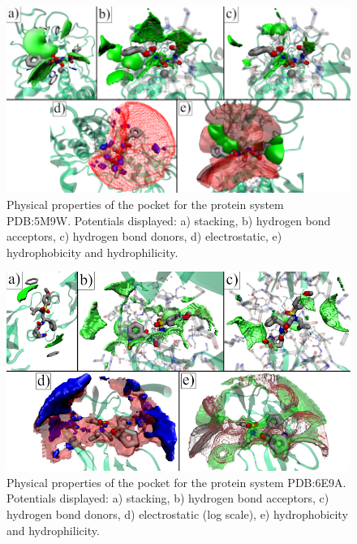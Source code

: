 \begin{figure}[H]
  \centering
  \includegraphics[width=1\textwidth]{figures/appendix/benchmark_prot/5m9w.png}
  \caption{\label{fig:appx_benchmark/5m9w} Physical properties of the pocket for the protein system PDB:5M9W. Potentials displayed: a) stacking, b) hydrogen bond acceptors, c) hydrogen bond donors, d) electrostatic, e) hydrophobicity and hydrophilicity.}
\end{figure}

\begin{figure}[H]
  \centering
  \includegraphics[width=1\textwidth]{figures/appendix/benchmark_prot/6e9a.png}
  \caption{\label{fig:appx_benchmark/6e9a} Physical properties of the pocket for the protein system PDB:6E9A. Potentials displayed: a) stacking, b) hydrogen bond acceptors, c) hydrogen bond donors, d) electrostatic (log scale), e) hydrophobicity and hydrophilicity.}
\end{figure}

